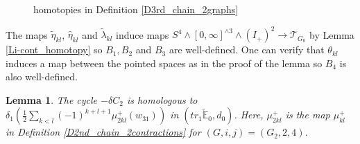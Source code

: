 \documentclass[reqno]{amsart}
\theoremstyle{definition}
\theoremstyle{plain}
\newtheorem{lem}[defi]{Lemma}
\newcommand{\TT}{\mathcal{T}} %
\newcommand{\CEE}{\check{\mathbb{E}}}
\begin{document}
\begin{figure}
\begin{center}
\hspace{-5mm}
\end{center}
\caption{homotopies in Definition \ref{D3rd_chain_2graphs}} \label{Fhomotopy_ch3}
\end{figure}
The maps $\tilde\eta_{kl}$, $\hat \eta_{kl}$ and $\tilde \lambda_{kl}$ induce maps $S^4\wedge [0,\infty]^{\wedge 3}\wedge (I_+)^2\to \TT_{G_0}$ by Lemma \ref{Li-cont_homotopy} so $B_1, B_2$ and $B_3$ are well-defined. One can verify that $\theta_{kl}$ induces a map between the pointed spaces as in the proof of the lemma so $B_4$ is also well-defined. 
\begin{lem}\label{L3rd_simplify}
The cycle $-\delta C_2$ is homologous to $\delta_1\left(\frac{1}{2}\sum_{k<l}(-1)^{k+l+1}\mu_{2kl}^+(w_{31})\right)$ in $(tr_1\CEE_0,d_0)$. Here, $\mu_{2kl}^+$ is the map $\mu_{kl}^+$ in Definition \ref{D2nd_chain_2contractions} for $(G,i,j)=(G_2,2,4)$. 
\end{lem}
\end{document}
